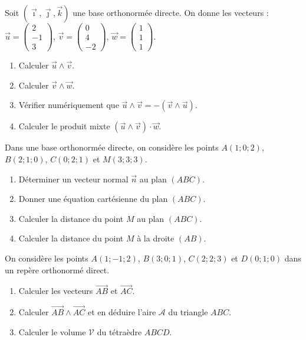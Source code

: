 \documentclass[11pt]{article}
\begin{document}
\begin{exercice}
Soit $(\vec{\imath}, \vec{\jmath}, \vec{k})$ une base orthonormée directe. On donne les vecteurs :
$\vec{u} = \begin{pmatrix} 2 \\ -1 \\ 3 \end{pmatrix}$, $\vec{v} = \begin{pmatrix} 0 \\ 4 \\ -2 \end{pmatrix}$, $\vec{w} = \begin{pmatrix} 1 \\ 1 \\ 1 \end{pmatrix}$.
\begin{enumerate}
    \item Calculer $\vec{u} \wedge \vec{v}$.
    \item Calculer $\vec{v} \wedge \vec{w}$.
    \item Vérifier numériquement que $\vec{u} \wedge \vec{v} = - (\vec{v} \wedge \vec{u})$.
    \item Calculer le produit mixte $(\vec{u} \wedge \vec{v}) \cdot \vec{w}$.
\end{enumerate}
\end{exercice}

\begin{exercice}
Dans une base orthonormée directe, on considère les points $A(1;0;2)$, $B(2;1;0)$, $C(0;2;1)$ et $M(3;3;3)$.
\begin{enumerate}
    \item Déterminer un vecteur normal $\vec{n}$ au plan $(ABC)$.
    \item Donner une équation cartésienne du plan $(ABC)$.
    \item Calculer la distance du point $M$ au plan $(ABC)$.
    \item Calculer la distance du point $M$ à la droite $(AB)$.
\end{enumerate}
\end{exercice}

\begin{exercice}
On considère les points $A(1;-1;2)$, $B(3;0;1)$, $C(2;2;3)$ et $D(0;1;0)$ dans un repère orthonormé direct.
\begin{enumerate}
    \item Calculer les vecteurs $\vec{AB}$ et $\vec{AC}$.
    \item Calculer $\vec{AB} \wedge \vec{AC}$ et en déduire l'aire $\mathcal{A}$ du triangle $ABC$.
    \item Calculer le volume $\mathcal{V}$ du tétraèdre $ABCD$.
\end{enumerate}
\end{exercice}
\end{document}
